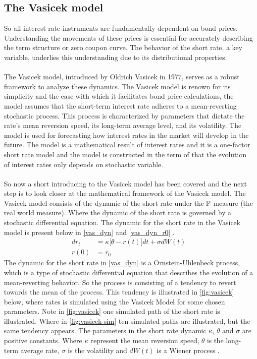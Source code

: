 \subsection{The Vasicek model}
So all interest rate instruments are fundamentally dependent on bond prices. Understanding the movements of 
these prices is essential for accurately describing the term structure or zero coupon curve. The behavior 
of the short rate, a key variable, underlies this understanding due to its distributional properties.
\\\\
The Vasicek model, introduced by Oldrich Vasicek in 1977, serves as a robust framework to analyze these dynamics.
The Vasicek model is renown for its simplicity and the ease with which it facilitates bond price calculations, 
the model assumes that the short-term interest rate adheres to a mean-reverting stochastic process. This process is characterized 
by parameters that dictate the rate's mean reversion speed, its long-term average level, and its volatility.
The model is used for forecasting how interest rates in the market will develop in the future. The model is a
mathematical result of interest rates and it is a one-factor short rate model and the model is constructed in the 
term of that the evolution of interest rates only depends on stochastic variable.
\\\\
So now a short introducing to the Vasicek model has been covered and the next step is to look closer at the 
mathematical framework of the Vasicek model. The Vasicek model consists of the dynamic of the short rate under the $\mathbb{P}$-measure
(the real world measure). Where the dynamic of the short rate is governed by a stochastic differential equation. 
The dynamic for the short rate in the Vasicek model is present below in \autoref{vas_dyn} and \autoref{vas_dyn_r0} \cite{Bjork}.
\begin{align}
    d r_t &= \kappa \Big[\theta -r(t)\Big] dt + \sigma d W(t) \label{vas_dyn}\\
    r(0) &= r_0 \label{vas_dyn_r0}
\end{align}
The dynamic for the short rate in \autoref{vas_dyn} is a Ornstein-Uhlenbeck process, which is a type of stochastic 
differential equation that describes the evolution of a mean-reverting behavior. So the process is consisting of a 
tendency to revert towards the mean of the process. This tendency is illustrated in \autoref{fig:vasicek} below, where 
 rates is simulated using the Vasicek Model for some chosen parameters. Note in \autoref{fig:vasicek}
one simulated path of the short rate is illustrated. Where in \autoref{fig:vasicek-sim} ten simulated paths are illustrated,
but the same tendency appears. The parameters in the short rate dynamic
$\kappa$, $\theta$ and $\sigma$ are positive constants. Where $\kappa$ represent the mean reversion speed, $\theta$ 
is the long-term average rate, $\sigma$ is the volatility  and $dW(t)$ is a Wiener process \cite{Bermudan}. 

